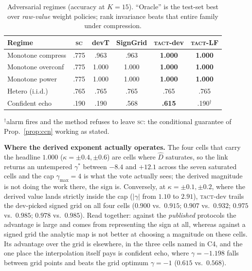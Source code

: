 \documentclass{article}
\newcommand{\Dhat}{\widehat{D}}
\newcommand{\SC}{\textsc{sc}}
\newcommand{\TACT}{\textsc{tact}}
\begin{document}
\begin{table}[t]
\centering
\caption{Adversarial regimes (accuracy at $K{=}15$). ``Oracle'' is the test-set best over \emph{raw-value} weight policies; rank invariance beats that entire family under compression.}
\label{tab:adv}
\setlength{\tabcolsep}{3.2pt}
\begin{tabular}{l cc cc c}
\toprule
Regime & \SC & devT & SignGrid & \textbf{\TACT-dev} & \textbf{\TACT-LF}\\
\midrule
Monotone compress & .775 & .963 & .963 & \textbf{1.000} & \textbf{1.000}\\
Monotone overconf & .775 & 1.000 & 1.000 & \textbf{1.000} & \textbf{1.000}\\
Monotone power & .775 & 1.000 & 1.000 & \textbf{1.000} & \textbf{1.000}\\
Hetero (i.i.d.) & .765 & .765 & .765 & .765 & .765\\
Confident echo & .190 & .190 & .568 & \textbf{.615} & .190$^{\dagger}$\\
\bottomrule
\end{tabular}
\vspace{2pt}
{\footnotesize $^{\dagger}$alarm fires and the method refuses to leave \SC:
the conditional guarantee of Prop.~\ref{prop:ccn} working as stated.}
\end{table}


\textbf{Where the derived exponent actually operates.} The four cells that
carry the headline $1.000$ ($\kappa=\pm0.4,\pm0.6$) are cells where $\Dhat$
saturates, so the link returns an untempered $\gamma^\ast$ between $-8.4$ and
$+12.1$ across the seven saturated cells and the cap $\gamma_{\max}=4$ is what
the vote actually sees; the derived magnitude is not doing the
work there, the sign is. Conversely, at $\kappa=\pm0.1,\pm0.2$, where the
derived value lands strictly inside the cap ($|\gamma|$ from $1.10$ to $2.91$),
\TACT-dev trails the dev-picked signed grid on all four cells ($0.900$ vs.\
$0.915$; $0.907$ vs.\ $0.932$; $0.975$ vs.\ $0.985$; $0.978$ vs.\ $0.985$).
Read together: against the \emph{published} protocols the advantage is large
and comes from representing the sign at all, whereas against a signed grid the
analytic map is not better at choosing a magnitude on these cells. Its
advantage over the grid is elsewhere, in the three cells named in C4, and the
one place the interpolation itself pays is confident echo, where $\gamma=-1.198$
falls between grid points and beats the grid optimum $\gamma=-1$
($0.615$ vs.\ $0.568$).
\end{document}
